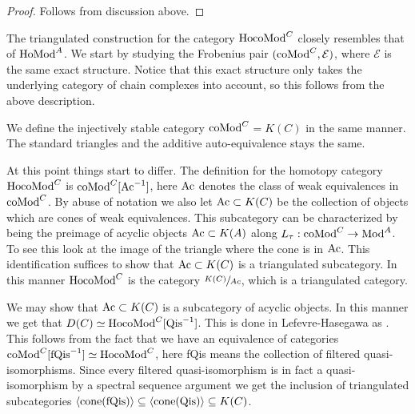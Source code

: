 \documentclass[../thesis.tex]{subfiles}
\begin{document}
            \begin{proof}
                Follows from discussion above.
            \end{proof}

            The triangulated construction for the category $\tt{Ho} \tt{coMod}^C$ closely resembles that of $\tt{Ho} \tt{Mod}^A$. We start by studying the Frobenius pair $(\tt{coMod}^C, \mathcal{E})$, where $\mathcal{E}$ is the same exact structure. Notice that this exact structure only takes the underlying category of chain complexes into account, so this follows from the above description.

            We define the injectively stable category \underline{$\tt{coMod}^C$}$=K(C)$ in the same manner. The standard triangles and the additive auto-equivalence stays the same.

            At this point things start to differ. The definition for the homotopy category $\tt{Ho} \tt{coMod}^C$ is $\tt{coMod}^C[\tt{Ac}^{-1}]$, here $\tt{Ac}$ denotes the class of weak equivalences in $\tt{coMod}^C$. By abuse of notation we also let $\tt{Ac}\subset K(C)$ be the collection of objects which are cones of weak equivalences. This subcategory can be characterized by being the preimage of acyclic objects $\tt{Ac}\subset K(A)$ along $L_\tau : \tt{coMod}^C \rightarrow \tt{Mod}^A$. To see this look at the image of the triangle where the cone is in $\tt{Ac}$. This identification suffices to show that $\tt{Ac}\subset K(C)$ is a triangulated subcategory. In this manner $\tt{Ho} \tt{coMod}^C$ is the category $\sfrac{K(C)}{Ac}$, which is a triangulated category.

            \begin{remark}
                We may show that $\tt{Ac}\subset K(C)$ is a subcategory of acyclic objects. In this manner we get that $D(C) \simeq \tt{Ho} \tt{coMod}^C[\tt{Qis}^{-1}]$. This is done in Lefevre-Hasegawa as \cite[Proposition 1.3.5.1][51]{LefevreHasegawa03} \cite[Lemma 2.2.2.11][75]{LefevreHasegawa03}. This follows from the fact that we have an equivalence of categories $\tt{coMod}^C[\tt{fQis}^{-1}]\simeq \tt{Ho} \tt{coMod}^C$, here fQis means the collection of filtered quasi-isomorphisms. Since every filtered quasi-isomorphism is in fact a quasi-isomorphism by a spectral sequence argument we get the inclusion of triangulated subcategories $\langle \tt{cone}(\tt{fQis})\rangle \subseteq \langle \tt{cone}(\tt{Qis})\rangle \subseteq K(C)$.
            \end{remark}
\end{document}
